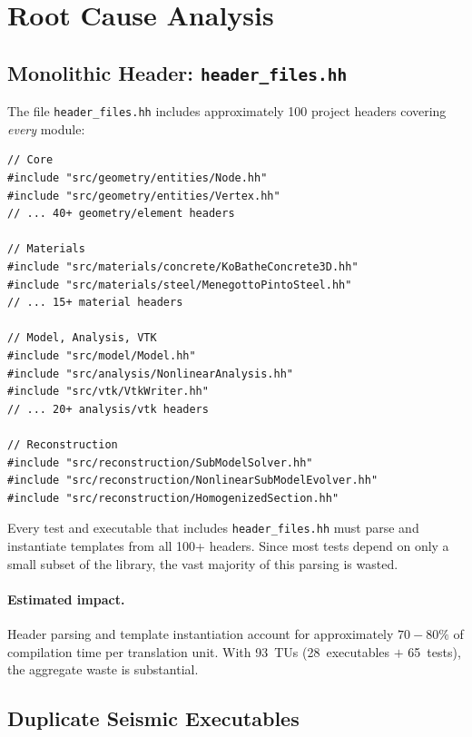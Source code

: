 \section{Root Cause Analysis}
\label{sec:build-root-cause}

\subsection{Monolithic Header: \texttt{header\_files.hh}}
\label{sec:build-monolithic-header}

The file \texttt{header\_files.hh} includes approximately 100
project headers covering \emph{every} module:

\begin{lstlisting}[caption={Excerpt from \texttt{header\_files.hh}.}]
// Core
#include "src/geometry/entities/Node.hh"
#include "src/geometry/entities/Vertex.hh"
// ... 40+ geometry/element headers

// Materials
#include "src/materials/concrete/KoBatheConcrete3D.hh"
#include "src/materials/steel/MenegottoPintoSteel.hh"
// ... 15+ material headers

// Model, Analysis, VTK
#include "src/model/Model.hh"
#include "src/analysis/NonlinearAnalysis.hh"
#include "src/vtk/VtkWriter.hh"
// ... 20+ analysis/vtk headers

// Reconstruction
#include "src/reconstruction/SubModelSolver.hh"
#include "src/reconstruction/NonlinearSubModelEvolver.hh"
#include "src/reconstruction/HomogenizedSection.hh"
\end{lstlisting}

Every test and executable that includes \texttt{header\_files.hh}
must parse and instantiate templates from all 100+ headers.  Since
most tests depend on only a small subset of the library, the vast
majority of this parsing is wasted.

\paragraph{Estimated impact.}
Header parsing and template instantiation account for approximately
$70{-}80\%$ of compilation time per translation unit.  With 93~TUs
(28~executables $+$ 65~tests), the aggregate waste is substantial.


\subsection{Duplicate Seismic Executables}
\label{sec:build-duplicate-seismic}

